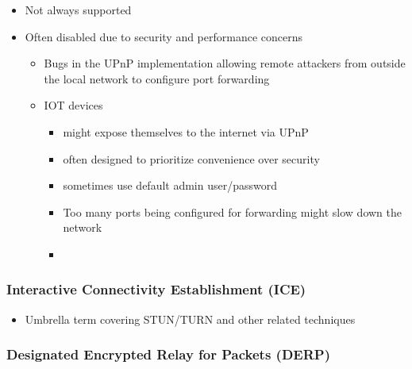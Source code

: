 \begin{itemize}
\tightlist
\item
  Not always supported
\item
  Often disabled due to security and performance concerns

  \begin{itemize}
  \tightlist
  \item
    Bugs in the UPnP implementation allowing remote attackers from
    outside the local network to configure port forwarding
  \item
    IOT devices

    \begin{itemize}
    \tightlist
    \item
      might expose themselves to the internet via UPnP
    \item
      often designed to prioritize convenience over security
    \item
      sometimes use default admin user/password
    \item
      Too many ports being configured for forwarding might slow down the
      network
    \item
    \end{itemize}
  \end{itemize}
\end{itemize}

\hypertarget{interactive-connectivity-establishment-ice}{%
\subsubsection{Interactive Connectivity Establishment
(ICE)}\label{interactive-connectivity-establishment-ice}}

\begin{itemize}
\tightlist
\item
  Umbrella term covering STUN/TURN and other related techniques
\end{itemize}

\hypertarget{designated-encrypted-relay-for-packets-derp}{%
\subsubsection{Designated Encrypted Relay for Packets
(DERP)}\label{designated-encrypted-relay-for-packets-derp}}

